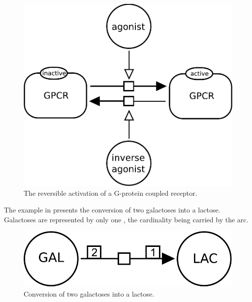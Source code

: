 \begin{figure}[H]
  \centering
  \includegraphics[scale = 0.3]{examples/transition-modulated}
  \caption{The reversible activation of a G-protein coupled receptor.}
  \label{fig:trans-mod}
\end{figure}

The example in  presents the conversion of two galactoses into a lactose.  Galactoses are represented by only one , the cardinality being carried by the  arc.

\begin{figure}[H]
  \centering
  \includegraphics[scale = 0.3]{examples/transition-dimerisation}
  \caption{Conversion of two galactoses into a lactose.}
  \label{fig:trans-dim}
\end{figure}




